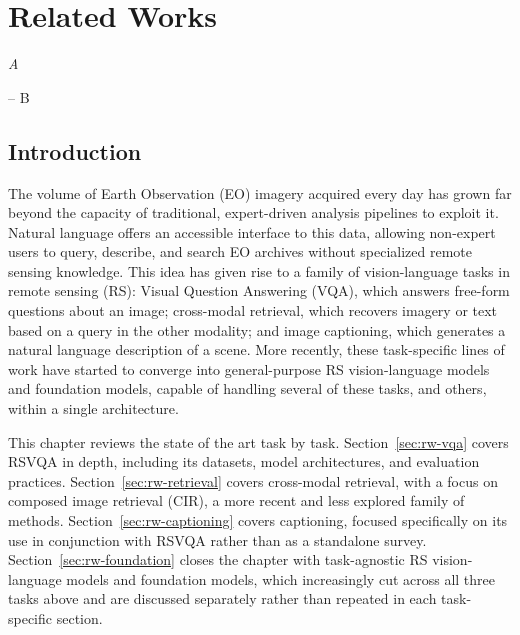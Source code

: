 \chapter{Related Works}
\label{chap:relatedworks}
\epigraph{\itshape  A}{-- B}

\startcontents[chapters]
\printmyminitoc{
}

\section{Introduction}
\label{sec:rw-intro}

The volume of Earth Observation (EO) imagery acquired every day has grown far beyond the capacity of traditional, expert-driven analysis pipelines to exploit it. Natural language offers an accessible interface to this data, allowing non-expert users to query, describe, and search EO archives without specialized remote sensing knowledge. This idea has given rise to a family of vision-language tasks in remote sensing (RS): Visual Question Answering (VQA), which answers free-form questions about an image; cross-modal retrieval, which recovers imagery or text based on a query in the other modality; and image captioning, which generates a natural language description of a scene. More recently, these task-specific lines of work have started to converge into general-purpose RS vision-language models and foundation models, capable of handling several of these tasks, and others, within a single architecture.

This chapter reviews the state of the art task by task. Section~\ref{sec:rw-vqa} covers RSVQA in depth, including its datasets, model architectures, and evaluation practices. Section~\ref{sec:rw-retrieval} covers cross-modal retrieval, with a focus on composed image retrieval (CIR), a more recent and less explored family of methods. Section~\ref{sec:rw-captioning} covers captioning, focused specifically on its use in conjunction with RSVQA rather than as a standalone survey. Section~\ref{sec:rw-foundation} closes the chapter with task-agnostic RS vision-language models and foundation models, which increasingly cut across all three tasks above and are discussed separately rather than repeated in each task-specific section.

